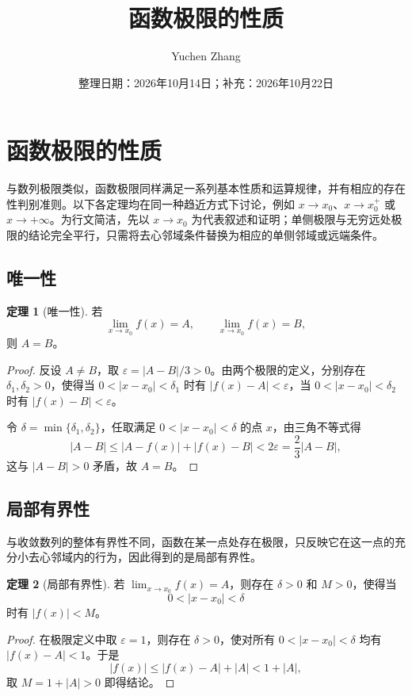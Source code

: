 \documentclass[UTF8,fontset=fandol,a4paper,12pt]{ctexart}
\title{函数极限的性质}
\author{Yuchen Zhang}
\date{整理日期：2026年10月14日；补充：2026年10月22日}
\makeatletter
\theoremstyle{definition}
\newtheorem{theorem}{定理}
\renewcommand{\maketitle}{\begin{center}
{\LARGE\bfseries \@title\par}\vspace{0.6em}
\@author\par\vspace{0.2em}{\small\@date\par}
\end{center}}
\makeatother
\begin{document}
\maketitle
\setcounter{section}{2}
\setcounter{theorem}{0}
\section{函数极限的性质}

与数列极限类似，函数极限同样满足一系列基本性质和运算规律，并有相应的存在性判别准则。以下各定理均在同一种趋近方式下讨论，例如 $x\to x_0$、$x\to x_0^+$ 或 $x\to+\infty$。为行文简洁，先以 $x\to x_0$ 为代表叙述和证明；单侧极限与无穷远处极限的结论完全平行，只需将去心邻域条件替换为相应的单侧邻域或远端条件。

\subsection*{唯一性}
\begin{theorem}[唯一性]
若
\[
 \lim_{x\to x_0}f(x)=A,\qquad \lim_{x\to x_0}f(x)=B,
\]
则 $A=B$。
\end{theorem}
\begin{proof}
反设 $A\ne B$，取 $\varepsilon=|A-B|/3>0$。由两个极限的定义，分别存在 $\delta_1,\delta_2>0$，使得当 $0<|x-x_0|<\delta_1$ 时有 $|f(x)-A|<\varepsilon$，当 $0<|x-x_0|<\delta_2$ 时有 $|f(x)-B|<\varepsilon$。

令 $\delta=\min\{\delta_1,\delta_2\}$，任取满足 $0<|x-x_0|<\delta$ 的点 $x$，由三角不等式得
\[
 |A-B|\le |A-f(x)|+|f(x)-B|<2\varepsilon
 =\frac23|A-B|,
\]
这与 $|A-B|>0$ 矛盾，故 $A=B$。
\end{proof}

\subsection*{局部有界性}
与收敛数列的整体有界性不同，函数在某一点处存在极限，只反映它在这一点的充分小去心邻域内的行为，因此得到的是局部有界性。

\begin{theorem}[局部有界性]
若 $\lim_{x\to x_0}f(x)=A$，则存在 $\delta>0$ 和 $M>0$，使得当
\[
 0<|x-x_0|<\delta
\]
时有 $|f(x)|<M$。
\end{theorem}
\begin{proof}
在极限定义中取 $\varepsilon=1$，则存在 $\delta>0$，使对所有 $0<|x-x_0|<\delta$ 均有 $|f(x)-A|<1$。于是
\[
 |f(x)|\le |f(x)-A|+|A|<1+|A|,
\]
取 $M=1+|A|>0$ 即得结论。
\end{proof}
\end{document}
